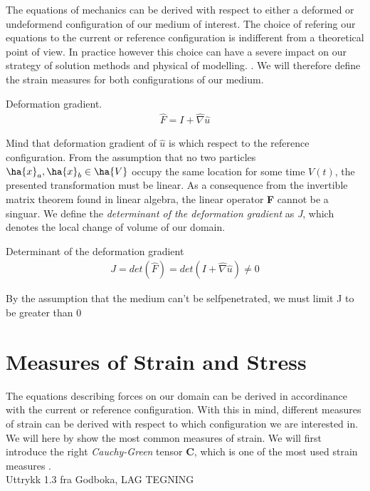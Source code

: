 The equations of mechanics can be derived with respect to either a deformed or undeformend configuration of our medium of interest. The choice of refering our equations to the current or reference configuration is indifferent from a theoretical point of view. In practice however this choice can have a severe impact on our strategy of solution methods and physical of modelling.   \cite{Wriggers2006}. We will therefore define the strain measures for both configurations of our medium.  

\begin{defn}
Deformation gradient. 
\begin{align}
\hat{F} = I + \hat{\nabla} \hat{u} 
\end{align} 
\end{defn}

Mind that deformation gradient of $\hat{u}$ is which respect to the reference configuration. 
From the assumption that no two particles $\ha{x}_a, \ha{x}_b \in \ha{V}$ occupy the same location for some time $V(t)$, the presented transformation must be linear. As a consequence from the invertible matrix theorem found in linear algebra, the linear operator \textbf{F} cannot be a singuar.  
We define the  \textit{determinant of the deformation gradient} as \textit{J}, which denotes the local change of volume of our domain. 

\begin{defn}
Determinant of the deformation gradient
\begin{align}
J = det(\hat{F}) = det( I + \hat{\nabla} \hat{u} ) \neq 0
\end{align} 
\end{defn}


By the assumption that the medium can't be selfpenetrated, we must limit  J to be greater than 0 \cite{Wriggers2006}

\section{Measures of Strain and Stress}
The equations describing forces on our domain can be derived in accordinance with the current or reference configuration. With this in mind, different measures of strain can be derived with respect to which configuration we are interested in. We will here by \cite{Richter2016} show the most common measures of strain. We will first introduce the right \textit{Cauchy-Green} tensor \textbf{C}, which is one of the most used strain measures \cite{Wriggers2006}. \\ Uttrykk 1.3 fra Godboka, LAG TEGNING \\ 


